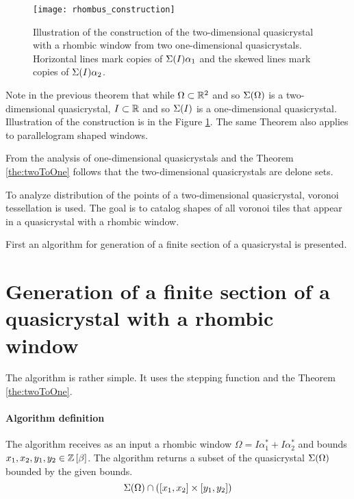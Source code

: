 \documentclass[text.tex]{subfiles}
\begin{document}
\begin{figure}[h]
\centering
\texttt{[image: rhombus\_construction]}
\caption{Illustration of the construction of the two-dimensional quasicrystal with a rhombic window from two one-dimensional quasicrystals. Horizontal lines mark copies of $\Sigma(I)\alpha_1$ and the skewed lines mark copies of $\Sigma(I)\alpha_2$.}
\label{fig:quasiRhombusConstruction}
\end{figure}

\begin{remark}
Note in the previous theorem that while $\Omega \subset \mathbb{R}^2$ and so $\Sigma(\Omega)$ is a two-dimensional quasicrystal, $I \subset \mathbb{R}$ and so $\Sigma(I)$ is a one-dimensional quasicrystal. Illustration of the construction is in the Figure \ref{fig:quasiRhombusConstruction}.
The same Theorem also applies to parallelogram shaped windows. 
\end{remark}

From the analysis of one-dimensional quasicrystals and the Theorem \ref{the:twoToOne} follows that the two-dimensional quasicrystals are delone sets.  

To analyze distribution of the points of a two-dimensional quasicrystal, voronoi tessellation is used. The goal is to catalog shapes of all voronoi tiles that appear in a quasicrystal with a rhombic window. 

First an algorithm for generation of a finite section of a quasicrystal is presented. 

%
\clearpage
\section{Generation of a finite section of a quasicrystal with a rhombic window}%
The algorithm is rather simple. It uses the stepping function and the Theorem \ref{the:twoToOne}. 

\paragraph{Algorithm definition} The algorithm receives as an input a rhombic window $\Omega = I\alpha_1^\ast + I\alpha_2^\ast$ and bounds $x_1, x_2, y_1, y_2 \in \mathbb{Z}\left[\beta\right]$.
The algorithm returns a subset of the quasicrystal $\Sigma(\Omega)$ bounded by the given bounds.
$$\Sigma(\Omega)\cap([x_1,x_2]\times[y_1,y_2])$$
\end{document}
